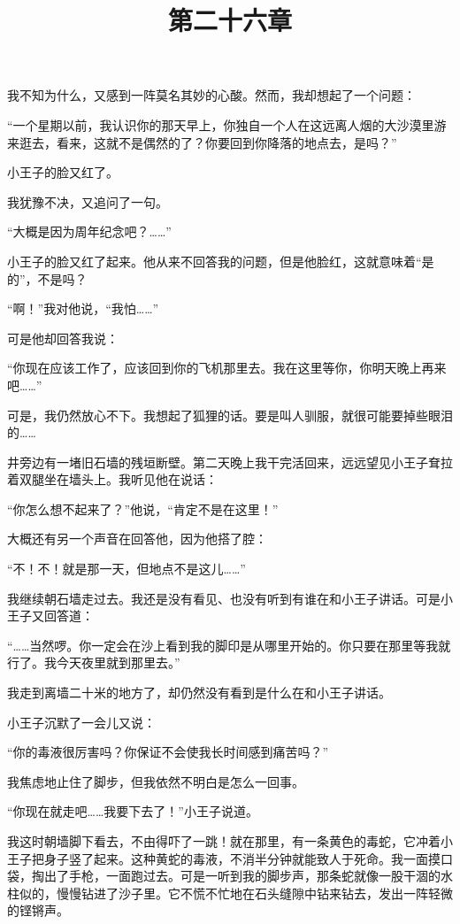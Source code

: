 我不知为什么，又感到一阵莫名其妙的心酸。然而，我却想起了一个问题：

“一个星期以前，我认识你的那天早上，你独自一个人在这远离人烟的大沙漠里游来逛去，看来，这就不是偶然的了？你要回到你降落的地点去，是吗？”

小王子的脸又红了。

我犹豫不决，又追问了一句。

“大概是因为周年纪念吧？\ldots{}\ldots{}”

小王子的脸又红了起来。他从来不回答我的问题，但是他脸红，这就意味着“是的”，不是吗？

“啊！”我对他说，“我怕\ldots{}\ldots{}”

可是他却回答我说：

“你现在应该工作了，应该回到你的飞机那里去。我在这里等你，你明天晚上再来吧\ldots{}\ldots{}”

可是，我仍然放心不下。我想起了狐狸的话。要是叫人驯服，就很可能要掉些眼泪的\ldots{}\ldots{}

\title{第二十六章}

井旁边有一堵旧石墙的残垣断壁。第二天晚上我干完活回来，远远望见小王子耷拉着双腿坐在墙头上。我听见他在说话：

“你怎么想不起来了？”他说，“肯定不是在这里！”

大概还有另一个声音在回答他，因为他搭了腔：

“不！不！就是那一天，但地点不是这儿\ldots{}\ldots{}”

我继续朝石墙走过去。我还是没有看见、也没有听到有谁在和小王子讲话。可是小王子又回答道：

“\ldots{}\ldots{}当然啰。你一定会在沙上看到我的脚印是从哪里开始的。你只要在那里等我就行了。我今天夜里就到那里去。”

我走到离墙二十米的地方了，却仍然没有看到是什么在和小王子讲话。

小王子沉默了一会儿又说：

“你的毒液很厉害吗？你保证不会使我长时间感到痛苦吗？”

我焦虑地止住了脚步，但我依然不明白是怎么一回事。

“你现在就走吧\ldots{}\ldots{}我要下去了！”小王子说道。

我这时朝墙脚下看去，不由得吓了一跳！就在那里，有一条黄色的毒蛇，它冲着小王子把身子竖了起来。这种黄蛇的毒液，不消半分钟就能致人于死命。我一面摸口袋，掏出了手枪，一面跑过去。可是一听到我的脚步声，那条蛇就像一股干涸的水柱似的，慢慢钻进了沙子里。它不慌不忙地在石头缝隙中钻来钻去，发出一阵轻微的铿锵声。

{\startalignment[center]
 \stopalignment}

